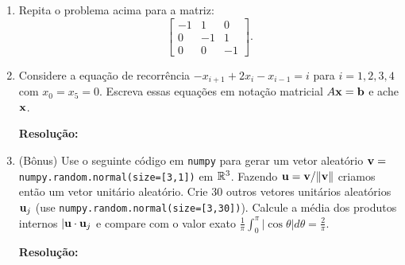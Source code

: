 \documentclass[leqno]{article}
\numberwithin{equation}{section}
\newenvironment{sol}
{
    \vspace{4mm}
    \noindent\textbf{Resolução:}
    \strut\newline
    \smallskip
    \hspace{-3.5mm}
}
{}
\begin{document}
\begin{enumerate}
\item Repita o problema acima para a matriz:
$$\begin{bmatrix}
-1 & 1 & 0\\
0 & -1 & 1\\
0 & 0 & -1
\end{bmatrix}.$$

\item Considere a equação de recorrência $-x_{i+1} + 2x_i - x_{i-1} = i$ para $i=1,2,3,4$ com $x_0 = x_5 = 0$. Escreva essas equações em notação matricial $A\mathbf{x} = \mathbf{b}$ e ache $\mathbf{x}$.

\begin{sol} 
\end{sol} 

\item (Bônus) Use o seguinte código em \texttt{numpy} para gerar um vetor aleatório $\mathbf{v}=$\texttt{numpy.random.normal(size=[3,1])} em $\mathbb{R}^3$. Fazendo $\mathbf{u} = \mathbf{v}/\|\mathbf{v}\|$ criamos então um vetor unitário aleatório. Crie 30 outros vetores unitários aleatórios $\mathbf{u}_j$ (use \texttt{numpy.random.normal(size=[3,30])}). Calcule a média dos produtos internos $|\mathbf{u} \cdot \mathbf{u}_j$ e compare com o valor exato $\frac{1}{\pi}\int_0^\pi |\cos \theta| d\theta = \frac{2}{\pi}$.

\begin{sol} 
\end{sol} 
\end{enumerate}
\end{document}
